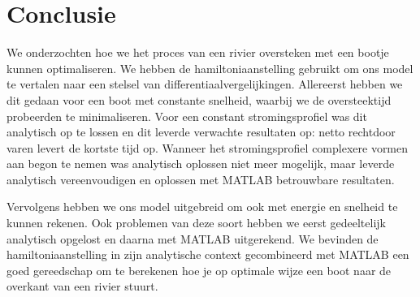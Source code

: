 \chapter{Conclusie}
We onderzochten hoe we het proces van een rivier oversteken met een bootje kunnen optimaliseren. We hebben de hamiltoniaanstelling gebruikt om ons model te vertalen naar een stelsel van differentiaalvergelijkingen. Allereerst hebben we dit gedaan voor een boot met constante snelheid, waarbij we de oversteektijd probeerden te minimaliseren. Voor een constant stromingsprofiel was dit analytisch op te lossen en dit leverde verwachte resultaten op: netto rechtdoor varen levert de kortste tijd op. Wanneer het stromingsprofiel complexere vormen aan begon te nemen was analytisch oplossen niet meer mogelijk, maar leverde analytisch vereenvoudigen en oplossen met MATLAB betrouwbare resultaten.

Vervolgens hebben we ons model uitgebreid om ook met energie en snelheid te kunnen rekenen. Ook problemen van deze soort hebben we eerst gedeeltelijk analytisch opgelost en daarna met MATLAB uitgerekend. We bevinden de hamiltoniaanstelling in zijn analytische context gecombineerd met MATLAB een goed gereedschap om te berekenen hoe je op optimale wijze een boot naar de overkant van een rivier stuurt.
